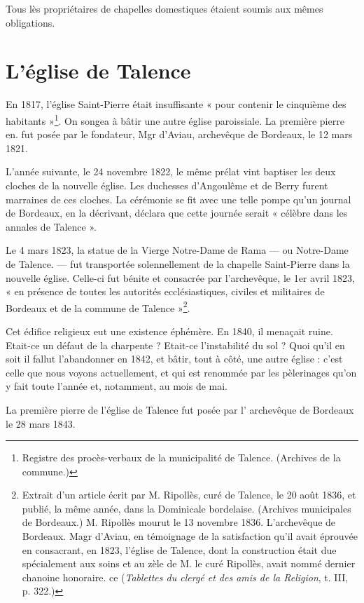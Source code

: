 \documentclass[a4paper,11pt]{book}
\begin{document}
Tous lès propriétaires de chapelles domestiques étaient soumis aux mêmes obligations.

\section{L'église de Talence}

En 1817, l'église Saint-Pierre était insuffisante « pour contenir le cinquième des habitants »\footnote{Registre des procès-verbaux de la municipalité de Talence. (Archives de la commune.)}. On songea à bâtir une autre église paroissiale. La première pierre en. fut posée par le fondateur, Mgr d'Aviau, archevêque de Bordeaux, le 12 mars 1821.

L'année suivante, le 24 novembre 1822, le même prélat vint baptiser les deux cloches de la nouvelle église. Les duchesses d'Angoulême et de Berry furent marraines de ces cloches. La cérémonie se fit avec une telle pompe qu'un journal de Bordeaux, en la décrivant, déclara que cette journée serait « célèbre dans les annales de Talence ». 

Le 4 mars 1823, la statue de la Vierge Notre-Dame de Rama — ou Notre-Dame de Talence. — fut transportée solennellement de la chapelle Saint-Pierre dans la nouvelle église. Celle-ci fut bénite et consacrée par l'archevêque, le 1er avril 1823, « en présence de toutes les autorités ecclésiastiques, civiles et militaires de Bordeaux et de la commune de Talence »\footnote{Extrait d'un article écrit par M. Ripollès, curé de Talence, le 20 août 1836, et publié, la même année, dans la Dominicale bordelaise. (Archives municipales de Bordeaux.) M. Ripollès mourut le 13 novembre 1836. L'archevêque de Bordeaux. Magr d'Aviau, en témoignage de la satisfaction qu'il avait éprouvée en consacrant, en 1823, l'église de Talence, dont la construction était due spécialement aux soins et au zèle de M. le curé Ripollès, avait nommé dernier chanoine honoraire. ce (\textit{Tablettes du clergé et des amis de la Religion}, t. III, p. 322.)}.

Cet édifice religieux eut une existence éphémère. En 1840, il menaçait ruine. Etait-ce un défaut de la charpente ? Etait-ce l'instabilité du sol ? Quoi qu'il en soit il fallut l'abandonner en 1842, et bâtir, tout à côté, une autre église : c'est celle que nous voyons actuellement, et qui est renommée par les pèlerinages qu'on y fait toute l'année et, notamment, au mois de mai.

La première pierre de l'église de Talence fut posée par l' archevêque de Bordeaux le 28 mars 1843.
\end{document}

